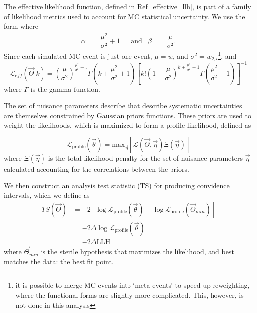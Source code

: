 \documentclass[main.tex]{subfiles}
\begin{document}
The effective likelihood function, defined in Ref~\ref{effective_llh}, is part of a family of likelihood metrics used to account for MC statistical uncertainty. 
We use the form where
\begin{align}
    \alpha&=\dfrac{\mu^{2}}{\sigma^{2}} +1 & &\text{and} & \beta&=\dfrac{\mu}{\sigma^{2}}.
\end{align}
Since each simulated MC event is just one event, $\mu = w_{i}$ and $\sigma^{2} = w_{2,i}$\footnote{it is possible to merge MC events into `meta-events' to speed up reweighting, where the functional forms are slightly more complicated. This, however, is not done in this analysis}, and
\begin{equation}
    \mathcal{L}_{eff}(\vec{\Theta} | k) = \left(\dfrac{\mu}{\sigma^{2}}\right)^{\tfrac{\mu^{2}}{\sigma^{2}} + 1} \Gamma\left(k + \dfrac{\mu^{2}}{\sigma^{2}} + 1\right) \left[ k! \left(1+\dfrac{\mu}{\sigma^{2}}\right)^{k+\tfrac{\mu^{2}}{\sigma^{2}} + 1} \Gamma\left(\dfrac{\mu^{2}}{\sigma^{2}} +1\right)\right]^{-1}
\end{equation}
where $\Gamma$ is the gamma function. 

The set of nuisance parameters describe that describe systematic uncertainties are themselves constrained by Gaussian priors functions. 
These priors are used to weight the likelihoods, which is maximized to form a profile likelihood, defined as 

\begin{equation}
\mathcal{L}_{\text{profile}}\left(\vec{\theta}\right) = \text{max}_{\vec{\eta}}\left[\mathcal{L}(\vec{\Theta}, \vec{\eta}) \Xi(\vec{\eta}) \right]
\end{equation}
where $\Xi(\vec{\eta})$ is the total likelihood penalty for the set of nuisance parameters $\vec{\eta}$ calculated accounting for the correlations between the priors. 

We then construct an analysis test statistic (TS) for producing convidence intervals, which we define as 
\begin{equation}\begin{split}
TS(\vec{\Theta}) &= -2\left[ \log\mathcal{L}_{\text{profile}}(\vec{\theta}) - \log\mathcal{L}_{\text{profile}}(\vec{\Theta}_{min}) \right] \\
&= -2 \Delta \log\mathcal{L}_{\text{profile}}(\vec{\theta})\\
&=-2\Delta \text{LLH}
\end{split}\end{equation}
where $\vec{\Theta}_{min}$ is the sterile hypothesis that maximizes the likelihood, and best matches the data: the best fit point. 
\end{document}
